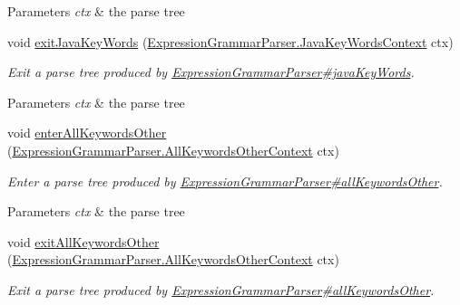 \begin{DoxyCompactItemize}
\begin{DoxyCompactList}
\begin{DoxyParams}{Parameters}
{\em ctx} & the parse tree\\
\hline
\end{DoxyParams}
 \end{DoxyCompactList}\item 
void \hyperlink{classgov_1_1nasa_1_1jpf_1_1inspector_1_1server_1_1expression_1_1parser_1_1_expression_grammar_base_listener_a9f6fc50c0185189be27d43de13b8484a}{exit\+Java\+Key\+Words} (\hyperlink{classgov_1_1nasa_1_1jpf_1_1inspector_1_1server_1_1expression_1_1parser_1_1_expression_grammar_parser_1_1_java_key_words_context}{Expression\+Grammar\+Parser.\+Java\+Key\+Words\+Context} ctx)
\begin{DoxyCompactList}\small\item\em Exit a parse tree produced by \hyperlink{classgov_1_1nasa_1_1jpf_1_1inspector_1_1server_1_1expression_1_1parser_1_1_expression_grammar_parser_ad2052f91a11b56131e3a746447f36634}{Expression\+Grammar\+Parser\#java\+Key\+Words}.


\begin{DoxyParams}{Parameters}
{\em ctx} & the parse tree\\
\hline
\end{DoxyParams}
 \end{DoxyCompactList}\item 
void \hyperlink{classgov_1_1nasa_1_1jpf_1_1inspector_1_1server_1_1expression_1_1parser_1_1_expression_grammar_base_listener_a732e61f1c107ecffb4307695532d40b5}{enter\+All\+Keywords\+Other} (\hyperlink{classgov_1_1nasa_1_1jpf_1_1inspector_1_1server_1_1expression_1_1parser_1_1_expression_grammar_pacb3381aaee949f84c436ba6b73657885}{Expression\+Grammar\+Parser.\+All\+Keywords\+Other\+Context} ctx)
\begin{DoxyCompactList}\small\item\em Enter a parse tree produced by \hyperlink{classgov_1_1nasa_1_1jpf_1_1inspector_1_1server_1_1expression_1_1parser_1_1_expression_grammar_parser_a785824ede173353ed534550da827b817}{Expression\+Grammar\+Parser\#all\+Keywords\+Other}.


\begin{DoxyParams}{Parameters}
{\em ctx} & the parse tree\\
\hline
\end{DoxyParams}
 \end{DoxyCompactList}\item 
void \hyperlink{classgov_1_1nasa_1_1jpf_1_1inspector_1_1server_1_1expression_1_1parser_1_1_expression_grammar_base_listener_abbb6060e6d95723cfbdec4f903b47c14}{exit\+All\+Keywords\+Other} (\hyperlink{classgov_1_1nasa_1_1jpf_1_1inspector_1_1server_1_1expression_1_1parser_1_1_expression_grammar_pacb3381aaee949f84c436ba6b73657885}{Expression\+Grammar\+Parser.\+All\+Keywords\+Other\+Context} ctx)
\begin{DoxyCompactList}\small\item\em Exit a parse tree produced by \hyperlink{classgov_1_1nasa_1_1jpf_1_1inspector_1_1server_1_1expression_1_1parser_1_1_expression_grammar_parser_a785824ede173353ed534550da827b817}{Expression\+Grammar\+Parser\#all\+Keywords\+Other}.



\end{DoxyCompactList}
\end{DoxyCompactItemize}

